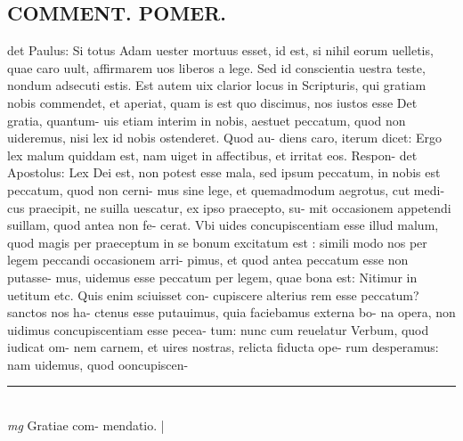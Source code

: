 \documentclass{article}
\begin{document}
\begin{pages}
\section*{COMMENT. POMER.  }\pstart det Paulus: Si totus Adam uester mortuus esset, id est, si nihil eorum uelletis, quae caro uult, affirmarem uos liberos a lege. Sed id conscientia uestra teste, nondum adsecuti estis. Est autem uix clarior locus in Scripturis, qui gratiam nobis commendet, et aperiat, quam is est quo discimus, nos iustos esse Det gratia, quantum- uis etiam interim in nobis, aestuet peccatum, quod non uideremus, nisi lex id nobis ostenderet. Quod au- diens caro, iterum dicet: Ergo lex malum quiddam est, nam uiget in affectibus, et irritat eos. Respon- det Apostolus: Lex Dei est, non potest esse mala, sed ipsum peccatum, in nobis est peccatum, quod non cerni- mus sine lege, et quemadmodum aegrotus, cut medi- cus praecipit, ne suilla uescatur, ex ipso praecepto, su- mit occasionem appetendi suillam, quod antea non fe- cerat. Vbi uides concupiscentiam esse illud malum, quod magis per praeceptum in se bonum excitatum est : simili modo nos per legem peccandi occasionem arri- pimus, et quod antea peccatum esse non putasse- mus, uidemus esse peccatum per legem, quae bona est: Nitimur in uetitum etc. Quis enim sciuisset con- cupiscere alterius rem esse peccatum? sanctos nos ha- ctenus esse putauimus, quia faciebamus externa bo- na opera, non uidimus concupiscentiam esse pecea- tum: nunc cum reuelatur Verbum, quod iudicat om- nem carnem, et uires nostras, relicta fiducta ope- rum desperamus: nam uidemus, quod ooncupiscen-  \pend
\vspace{0.5cm}\noindent
\vspace{0.2cm}\rule{1cm}{0.2pt}\\ 
\hspace{0.2cm}\textit{mg}
\footnotesize Gratiae com- mendatio.  
\normalsize| 

\end{pages}
\end{document}

